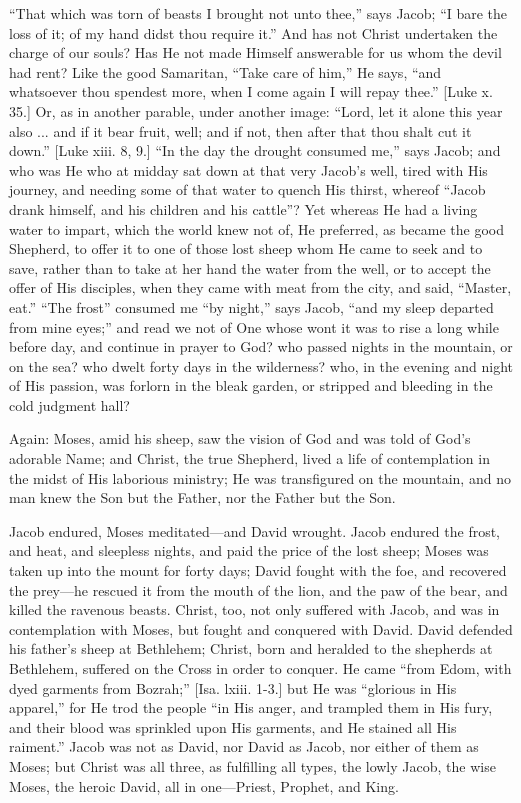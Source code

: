 ``That which was torn of beasts I brought not unto thee,''
says Jacob; ``I bare the loss of it; of my hand didst thou require
it.'' And has not Christ undertaken the charge of our souls? Has
He not made Himself answerable for us whom the devil had rent? Like
the good Samaritan, ``Take care of him,'' He says, ``and
whatsoever thou spendest more, when I come again I will repay
thee.'' [Luke x. 35.] Or, as in another parable, under another
image: ``Lord, let it alone this year also ... and if it bear
fruit, well; and if not, then after that thou shalt cut it down.''
[Luke xiii. 8, 9.] ``In the day the drought consumed me,''
says Jacob; and who was He who at midday sat down at that very Jacob's
well, tired with His journey, and needing some of that water to quench
His thirst, whereof ``Jacob drank himself, and his children and
his cattle''? Yet whereas He had a living water to impart, which
the world knew not of, He preferred, as became the good Shepherd, to
offer it to one of those lost sheep whom He came to seek and to save,
rather than to take at her hand the water from the well, or to accept
the offer of His disciples, when they came with meat from the city,
and said, ``Master, eat.'' ``The frost'' consumed me
``by night,'' says Jacob, ``and my sleep departed from
mine eyes;'' and read we not of One whose wont it was to rise a
long while before day, and continue in prayer to God? who passed
nights in the mountain, or on the sea? who dwelt forty days in the
wilderness? who, in the evening and night of His passion, was forlorn
in the bleak garden, or stripped and bleeding in the cold judgment
hall?

Again: Moses, amid his sheep, saw the vision of God and was told of
God's adorable Name; and Christ, the true Shepherd, lived a life of
contemplation in the midst of His laborious ministry; He was
transfigured on the mountain, and no man knew the Son but the Father,
nor the Father but the Son.

Jacob endured, Moses meditated—and David wrought. Jacob endured
the frost, and heat, and sleepless nights, and paid the price of the
lost sheep; Moses was taken up into the mount for forty days; David
fought with the foe, and recovered the prey—he rescued it from the
mouth of the lion, and the paw of the bear, and killed the ravenous
beasts. Christ, too, not only suffered with Jacob, and was in
contemplation with Moses, but fought and conquered with David. David
defended his father's sheep at Bethlehem; Christ, born and heralded to
the shepherds at Bethlehem, suffered on the Cross in order to conquer.
He came ``from Edom, with dyed garments from Bozrah;'' [Isa.
lxiii. 1-3.] but He was ``glorious in His apparel,'' for He
trod the people ``in His anger, and trampled them in His fury, and
their blood was sprinkled upon His garments, and He stained all His
raiment.'' Jacob was not as David, nor David as Jacob, nor either
of them as Moses; but Christ was all three, as fulfilling all types,
the lowly Jacob, the wise Moses, the heroic David, all in one—Priest,
Prophet, and King.

